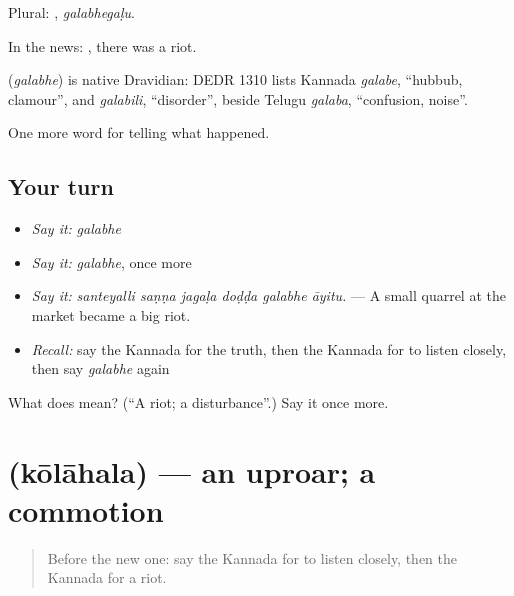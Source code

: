 Plural: , \emph{galabhegaḷu}.

In the news:  , there was a riot.

\begin{cousinweb}
\textbf{} (\emph{galabhe}) is native Dravidian: DEDR 1310 lists Kannada \emph{galabe}, \textquotedblleft{}hubbub, clamour\textquotedblright{}, and \emph{galabili}, \textquotedblleft{}disorder\textquotedblright{}, beside Telugu \emph{galaba}, \textquotedblleft{}confusion, noise\textquotedblright{}.
\end{cousinweb}

\begin{grammarlens}[title={What you've built}]
One more word for telling what happened.
\end{grammarlens}

\subsection*{Your turn}
\begin{itemize}
\raggedright
  \item \emph{Say it:} \emph{galabhe}
  \item \emph{Say it:} \emph{galabhe}, once more
  \item \emph{Say it:} \emph{santeyalli saṇṇa jagaḷa doḍḍa galabhe āyitu.} — A small quarrel at the market became a big riot.
  \item \emph{Recall:} say the Kannada for the truth, then the Kannada for to listen closely, then say \emph{galabhe} again
\end{itemize}

\begin{tcolorbox}[breakable,colback=teal!4,colframe=teal!35!black,title={Before you move on}]
What does  mean? (\textquotedblleft{}A riot; a disturbance\textquotedblright{}.) Say it once more.
\end{tcolorbox}
\section[\texorpdfstring{\kn{ಕೋಲಾಹಲ} (kōlāhala)}{ಕೋಲಾಹಲ (kōlāhala)}]{ (kōlāhala) — an uproar; a commotion}

\label{lesson:KA-C339-kolahala}



\begin{quote}
Before the new one: say the Kannada for to listen closely, then the Kannada for a riot.
\end{quote}

